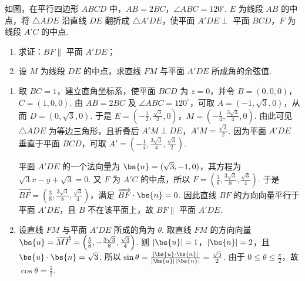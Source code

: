 \begin{problem}
如图，在平行四边形 \(ABCD\) 中，\(AB = 2BC\)，\(\angle ABC = 120^{\circ}\). \(E\) 为线段 \(AB\) 的中点，将 \(\triangle ADE\) 沿直线 \(DE\) 翻折成 \(\triangle A'DE\)，使平面 \(A'DE \perp\) 平面 \(BCD\)，\(F\) 为线段 \(A'C\) 的中点.

\begin{enumerate}
\item 求证：\(BF \parallel\) 平面 \(A'DE\)；
\item 设 \(M\) 为线段 \(DE\) 的中点，求直线 \(FM\) 与平面 \(A'DE\) 所成角的余弦值.
\end{enumerate}

\end{problem}

\begin{solution}
\begin{enumerate}
\item 取 \(BC=1\)，建立直角坐标系，使平面 \(BCD\) 为 \(z=0\)，并令 \(B=(0,0,0)\)，\(C=(1,0,0)\). 由 \(AB=2BC\) 及 \(\angle ABC=120^{\circ}\)，可取
\(A=(-1,\sqrt{3},0)\)，从而 \(D=(0,\sqrt{3},0)\). 于是
\(E=\left(-\frac{1}{2},\frac{\sqrt{3}}{2},0\right)\)，\(M=\left(-\frac{1}{4},\frac{3\sqrt{3}}{4},0\right)\). 由此可见 \(\triangle ADE\) 为等边三角形，且折叠后 \(A'M\perp DE\)，\(A'M=\frac{\sqrt{3}}{2}\). 因为平面 \(A'DE\) 垂直于平面 \(BCD\)，可取
\(A'=\left(-\frac{1}{4},\frac{3\sqrt{3}}{4},\frac{\sqrt{3}}{2}\right)\).

平面 \(A'DE\) 的一个法向量为 \(\bs{n}=(\sqrt{3},-1,0)\)，其方程为 \(\sqrt{3}x-y+\sqrt{3}=0\). 又 \(F\) 为 \(A'C\) 的中点，所以
\(F=\left(\frac{3}{8},\frac{3\sqrt{3}}{8},\frac{\sqrt{3}}{4}\right)\). 于是 \(\overrightarrow{BF}=\left(\frac{3}{8},\frac{3\sqrt{3}}{8},\frac{\sqrt{3}}{4}\right)\)，满足 \(\overrightarrow{BF}\cdot\bs{n}=0\). 因此直线 \(BF\) 的方向向量平行于平面 \(A'DE\)，且 \(B\) 不在该平面上，故 \(BF\parallel\) 平面 \(A'DE\).
\item 设直线 \(FM\) 与平面 \(A'DE\) 所成的角为 \(\theta\). 取直线 \(FM\) 的方向向量
\(\bs{u}=\overrightarrow{MF}=\left(\frac{5}{8},-\frac{3\sqrt{3}}{8},\frac{\sqrt{3}}{4}\right)\). 则 \(|\bs{u}|=1\)，\(|\bs{n}|=2\)，且 \(\bs{u}\cdot\bs{n}=\sqrt{3}\). 所以
\(\sin\theta=\frac{|\bs{u}\cdot\bs{n}|}{|\bs{u}|\,|\bs{n}|}=\frac{\sqrt{3}}{2}\). 由于 \(0\leqslant\theta\leqslant\frac{\pi}{2}\)，故 \(\cos\theta=\frac{1}{2}\).
\end{enumerate}
\end{solution}

